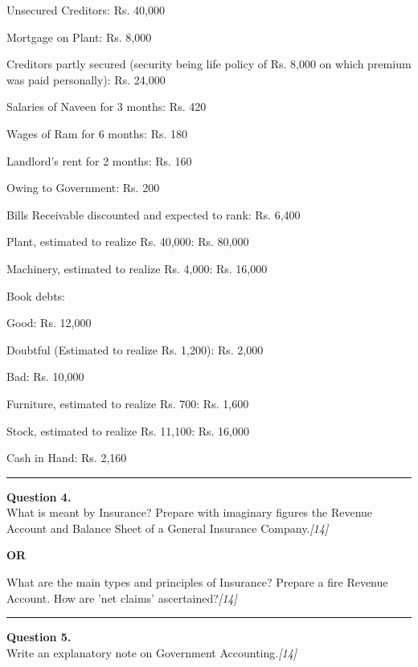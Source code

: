 \documentclass[11pt,a4paper]{article}
\newcommand{\pts}[1]{\hfill   \textit{[#1]}}
\begin{document}
\begin{parts}
  \item Unsecured Creditors: Rs. 40,000
  \item Mortgage on Plant: Rs. 8,000
  \item Creditors partly secured (security being life policy of Rs. 8,000 on which premium was paid personally): Rs. 24,000
  \item Salaries of Naveen for 3 months: Rs. 420
  \item Wages of Ram for 6 months: Rs. 180
  \item Landlord's rent for 2 months: Rs. 160
  \item Owing to Government: Rs. 200
  \item Bills Receivable discounted and expected to rank: Rs. 6,400
  \item Plant, estimated to realize Rs. 40,000: Rs. 80,000
  \item Machinery, estimated to realize Rs. 4,000: Rs. 16,000
  \item Book debts:
    
\begin{parts}
      \item Good: Rs. 12,000
      \item Doubtful (Estimated to realize Rs. 1,200): Rs. 2,000
      \item Bad: Rs. 10,000
    \end{parts}
  \item Furniture, estimated to realize Rs. 700: Rs. 1,600
  \item Stock, estimated to realize Rs. 11,100: Rs. 16,000
  \item Cash in Hand: Rs. 2,160
\end{parts}

\medskip\rule{\linewidth}{0.2pt}




\noindent   \textbf{Question 4.} \\
What is meant by Insurance? Prepare with imaginary figures the Revenue Account and Balance Sheet of a General Insurance Company.\pts{14}

\centerline{   \textbf{OR}}

What are the main types and principles of Insurance? Prepare a fire Revenue Account. How are 'net claims' ascertained?\pts{14}

\medskip\rule{\linewidth}{0.2pt}




\noindent   \textbf{Question 5.} \\
Write an explanatory note on Government Accounting.\pts{14}
\end{document}
